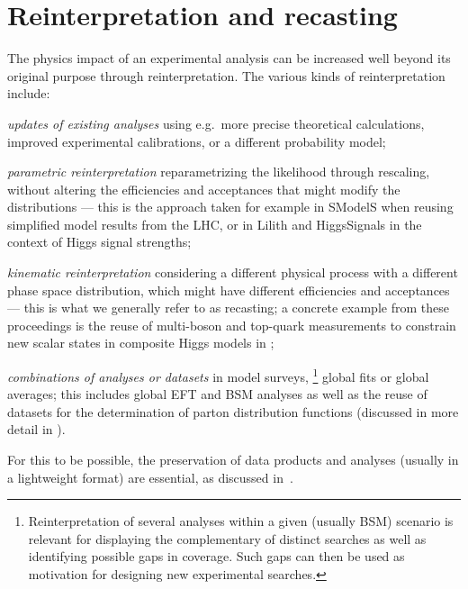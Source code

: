 \documentclass[11pt]{article}
\begin{document}
\section{Reinterpretation and recasting}
\label{reinterpret}

The physics impact of an experimental analysis can be increased well beyond its original purpose through \gls{reinterpretation}.
The various kinds of \gls{reinterpretation} include:
\begin{description}
	\item{\it updates of existing analyses} using e.g.\ more precise theoretical calculations, improved experimental calibrations, or a different probability model;
	\item{\it parametric reinterpretation} reparametrizing the likelihood through rescaling, without altering the efficiencies and acceptances that might modify the distributions --- this is the approach taken for example in SModelS when reusing simplified model results from the LHC, or in Lilith and HiggsSignals in the context of Higgs signal strengths; 
    \item{\it kinematic reinterpretation} considering a different physical process with a different phase space distribution, which might have different efficiencies and acceptances --- this is what we generally refer to as \gls{recasting}; a concrete example from these proceedings is the reuse of multi-boson and top-quark measurements to constrain new scalar states in composite Higgs models in \cite{Banerjee:2022xmu}; 
    \item{\it combinations of analyses or datasets} in model surveys,%
    \footnote{Reinterpretation of several analyses within a given (usually \gls{BSM}) scenario is relevant for displaying the complementary of distinct searches as well as identifying possible gaps in coverage. Such gaps can then be used as motivation for designing new experimental searches.} 
    global fits or global averages; this includes global EFT and BSM analyses as well as the reuse of datasets for the determination of parton distribution functions (discussed in more detail in \cite{Cranmer:2021urp}).
\end{description}

For this to be possible, the preservation of \glspl{data product} and analyses (usually in a lightweight format) are essential, as discussed in~.
\end{document}
